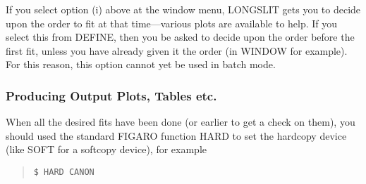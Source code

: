 If you select option (i) above at the window menu, LONGSLIT gets you to
decide upon the order to fit at that time---various plots are available
to help.
If you select this from DEFINE, then you be asked to decide upon the
order before the first fit, unless you have already given it the order
(in WINDOW for example).
For this reason, this option cannot yet be used in batch mode.

\subsubsection{Producing Output Plots, Tables etc.}
\label{long.out}

When all the desired fits have been done (or
earlier to get a check on them), you should used the standard FIGARO
function HARD to set the hardcopy device (like SOFT for a softcopy
device), for example
\begin{quote}\begin{verbatim}
$ HARD CANON
\end{verbatim}\end{quote}

